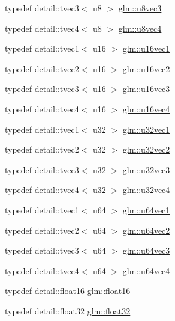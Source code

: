 \begin{DoxyCompactItemize}
typedef detail\+::tvec3$<$ u8 $>$ \hyperlink{group__gtc__type__precision_ga4dcca30d49842b1f4c919a0303944099}{glm\+::u8vec3}
\item 
typedef detail\+::tvec4$<$ u8 $>$ \hyperlink{group__gtc__type__precision_ga165acf96e342bac32fe1dbf5bfd8a4e1}{glm\+::u8vec4}
\item 
typedef detail\+::tvec1$<$ u16 $>$ \hyperlink{group__gtc__type__precision_gadfda7307e98ab4ab001bf16e8af84b64}{glm\+::u16vec1}
\item 
typedef detail\+::tvec2$<$ u16 $>$ \hyperlink{group__gtc__type__precision_gac4edd601deebcb0c6406814aeb28edc5}{glm\+::u16vec2}
\item 
typedef detail\+::tvec3$<$ u16 $>$ \hyperlink{group__gtc__type__precision_gadce584ceb1de400c392cb2df1b343df9}{glm\+::u16vec3}
\item 
typedef detail\+::tvec4$<$ u16 $>$ \hyperlink{group__gtc__type__precision_ga0144c89f52e4b5ca057f5349cdd80bf2}{glm\+::u16vec4}
\item 
typedef detail\+::tvec1$<$ u32 $>$ \hyperlink{group__gtc__type__precision_ga690033f989275bb90f793a785dc45521}{glm\+::u32vec1}
\item 
typedef detail\+::tvec2$<$ u32 $>$ \hyperlink{group__gtc__type__precision_ga6cad9c800c714098d4adc0ee7746b48c}{glm\+::u32vec2}
\item 
typedef detail\+::tvec3$<$ u32 $>$ \hyperlink{group__gtc__type__precision_gac56c189cd9527b002389e43076f30805}{glm\+::u32vec3}
\item 
typedef detail\+::tvec4$<$ u32 $>$ \hyperlink{group__gtc__type__precision_ga5cd7923918307032d87d7d5ce0257c15}{glm\+::u32vec4}
\item 
typedef detail\+::tvec1$<$ u64 $>$ \hyperlink{group__gtc__type__precision_ga8a4606421d8f5a874a21bc31346103cb}{glm\+::u64vec1}
\item 
typedef detail\+::tvec2$<$ u64 $>$ \hyperlink{group__gtc__type__precision_gad17df8c10793777ec3081fc40b801935}{glm\+::u64vec2}
\item 
typedef detail\+::tvec3$<$ u64 $>$ \hyperlink{group__gtc__type__precision_gaf3e98e85d5dd32134bf6235db89c9629}{glm\+::u64vec3}
\item 
typedef detail\+::tvec4$<$ u64 $>$ \hyperlink{group__gtc__type__precision_ga550e091ec7bcd4aff560a8f5c5ff539f}{glm\+::u64vec4}
\item 
typedef detail\+::float16 \hyperlink{group__gtc__type__precision_ga50c577688ec4cbdb3dfafb8e8155c82f}{glm\+::float16}
\item 
typedef detail\+::float32 \hyperlink{group__gtc__type__precision_ga814f2f65354b6588b067cc5c67a6b340}{glm\+::float32}

\end{DoxyCompactItemize}
